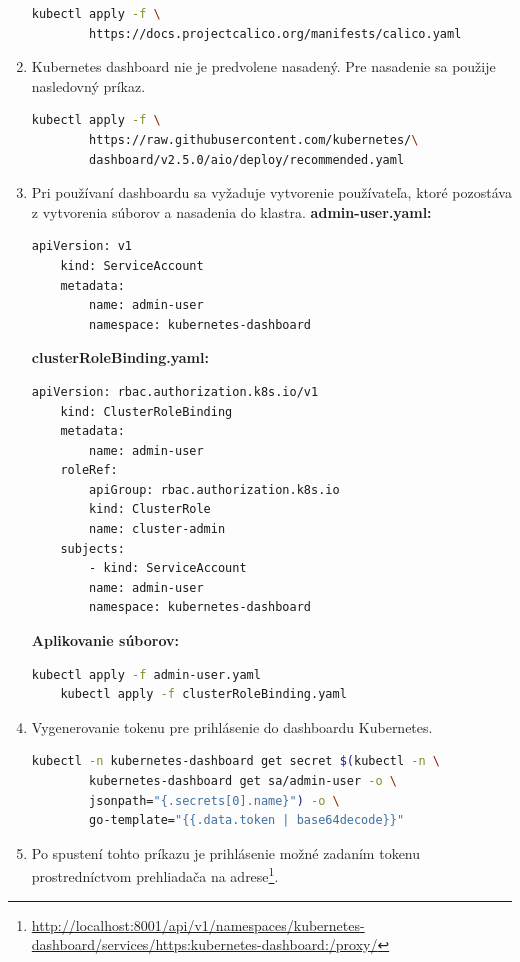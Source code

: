 \begin{enumerate}
{\begin{lstlisting}[language=Bash,basicstyle=\footnotesize]
    kubectl apply -f \
        https://docs.projectcalico.org/manifests/calico.yaml
\end{lstlisting}}
\item{\noindent Kubernetes dashboard nie je predvolene nasadený. Pre nasadenie sa použije nasledovný príkaz.
\begin{lstlisting}[language=Bash,basicstyle=\footnotesize]
    kubectl apply -f \
        https://raw.githubusercontent.com/kubernetes/\
        dashboard/v2.5.0/aio/deploy/recommended.yaml
\end{lstlisting}}
\item{\noindent Pri používaní dashboardu sa vyžaduje vytvorenie používateľa, ktoré pozostáva z vytvorenia súborov a nasadenia do klastra.\br
\indent \textbf{admin-user.yaml:}
\begin{lstlisting}[language=Bash,basicstyle=\footnotesize]
    apiVersion: v1
    kind: ServiceAccount
    metadata:
        name: admin-user
        namespace: kubernetes-dashboard
\end{lstlisting}
\indent \textbf{clusterRoleBinding.yaml:}
\begin{lstlisting}[language=Bash,basicstyle=\footnotesize]
    apiVersion: rbac.authorization.k8s.io/v1
    kind: ClusterRoleBinding
    metadata:
        name: admin-user
    roleRef:
        apiGroup: rbac.authorization.k8s.io
        kind: ClusterRole
        name: cluster-admin
    subjects:
        - kind: ServiceAccount
        name: admin-user
        namespace: kubernetes-dashboard
\end{lstlisting}
\indent \textbf{Aplikovanie súborov:}
\begin{lstlisting}[language=Bash,basicstyle=\footnotesize]
    kubectl apply -f admin-user.yaml
    kubectl apply -f clusterRoleBinding.yaml
\end{lstlisting}}
\item{\noindent Vygenerovanie tokenu pre prihlásenie do dashboardu Kubernetes.
\begin{lstlisting}[language=Bash,basicstyle=\footnotesize]
    kubectl -n kubernetes-dashboard get secret $(kubectl -n \
        kubernetes-dashboard get sa/admin-user -o \
        jsonpath="{.secrets[0].name}") -o \
        go-template="{{.data.token | base64decode}}"
\end{lstlisting}}
\item{\noindent Po spustení tohto príkazu je prihlásenie možné zadaním tokenu prostredníctvom prehliadača na adrese\footnote{\url{http://localhost:8001/api/v1/namespaces/kubernetes-dashboard/services/https:kubernetes-dashboard:/proxy/}}.
}
\end{enumerate}
